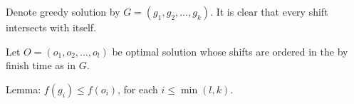 \begin{soln}
	Denote greedy solution by \(G = (g_1, g_2, \dots, g_k)\). It is clear that every shift intersects with itself.

	Let \(O = (o_1, o_2, \dots, o_l)\) be optimal solution whose shifts are ordered in the by finish time as in \(G\).

	Lemma: \(f(g_i) \leq f(o_i)\), for each \(i \leq \min(l, k)\).
\end{soln}
